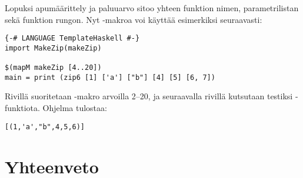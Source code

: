 Lopuksi apumäärittely  ja paluuarvo  sitoo yhteen
funktion nimen, parametrilistan sekä funktion rungon.
Nyt -makroa voi käyttää esimerkiksi seuraavasti:
\begin{verbatim}
{-# LANGUAGE TemplateHaskell #-}
import MakeZip(makeZip)

$(mapM makeZip [4..20])
main = print (zip6 [1] ['a'] ["b"] [4] [5] [6, 7])
\end{verbatim}
\iffalse
$ %
\fi
Rivillä  suoritetaan -makro arvoilla 2--20,
ja seuraavalla rivillä kutsutaan testiksi -funktiota.
Ohjelma tulostaa:
\begin{verbatim}
[(1,'a',"b",4,5,6)]
\end{verbatim}

\section{Yhteenveto}
